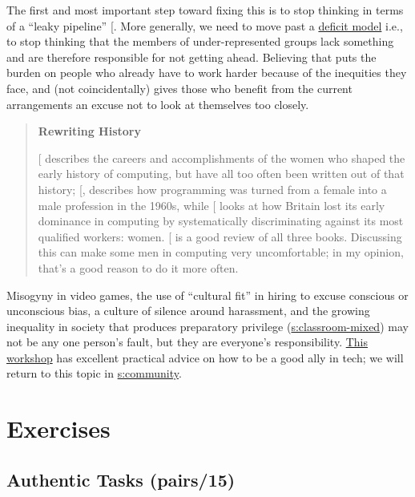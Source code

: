 The first and most important step toward fixing this is to stop thinking
in terms of a ``leaky pipeline'' {[}\protect[\hyperlink{b:Mill2015}{Mill2015}]{]}. More generally, we need to
move past a \protect\hyperlink{g:deficit-model}{deficit model} i.e., to stop
thinking that the members of under-represented groups lack something and
are therefore responsible for not getting ahead. Believing that puts the
burden on people who already have to work harder because of the
inequities they face, and (not coincidentally) gives those who benefit
from the current arrangements an excuse not to look at themselves too
closely.

\begin{quote}\setlength{\parindent}{0pt}
\textbf{Rewriting History}

{[}\protect[\hyperlink{b:Abba2012}{Abba2012}]{]} describes the careers and accomplishments of the
women who shaped the early history of computing, but have all too
often been written out of that history; {[},\protect[\hyperlink{b:Ensm2012}{Ensm2012}]{]}
describes how programming was turned from a female into a male
profession in the 1960s, while {[}\protect[\hyperlink{b:Hick2018}{Hick2018}]{]} looks at how Britain
lost its early dominance in computing by systematically discriminating
against its most qualified workers: women. {[}\protect[\hyperlink{b:Milt2018}{Milt2018}]{]} is a
good review of all three books. Discussing this can make some men in
computing very uncomfortable; in my opinion, that's a good reason to
do it more often.
\end{quote}

Misogyny in video games, the use of ``cultural fit'' in hiring to excuse
conscious or unconscious bias, a culture of silence around harassment,
and the growing inequality in society that produces preparatory
privilege (\protect\hyperlink{SECTION}{s:classroom-mixed}) may not be any one person's
fault, but they are everyone's responsibility. \href{https://frameshiftconsulting.com/ally-skills-workshop/}{This
workshop} has excellent practical advice on how to be
a good ally in tech; we will return to this topic in
\protect\hyperlink{CHAPTER}{s:community}.

\section{Exercises}\label{s:motivation-exercises}

\subsection{Authentic Tasks (pairs/15)}\label{authentic-tasks-pairs15}

